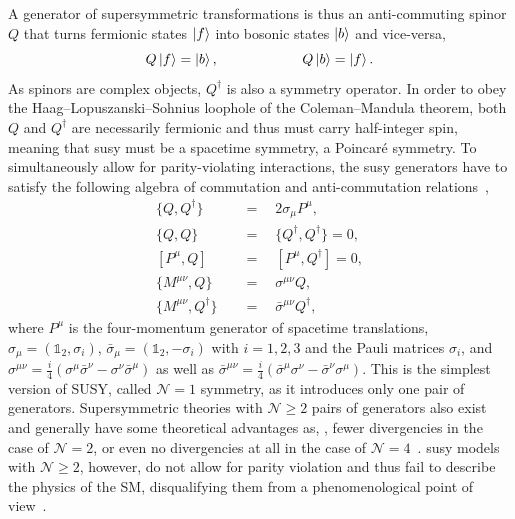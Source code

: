A generator of supersymmetric transformations is thus an anti-commuting spinor $Q$ that turns fermionic states $\ket{f}$ into bosonic states $\ket{b}$ and vice-versa,
\begin{equation}
	Q\ket{f} = \ket{b}, \qquad \qquad \qquad Q\ket{b}=\ket{f}.
\end{equation}
As spinors are complex objects, $Q^\dagger$ is also a symmetry operator. In order to obey the Haag--Lopuszanski--Sohnius loophole of the Coleman--Mandula theorem, both $Q$ and $Q^\dagger$ are necessarily fermionic and thus must carry half-integer spin, meaning that \gls{susy} must be a spacetime symmetry, \ie a Poincaré symmetry. To simultaneously allow for parity-violating interactions, the \gls{susy} generators have to satisfy the following algebra of commutation and anti-commutation relations~\cite{Bustamante:2009us},
\begin{equation}
\begin{split}
	\{ Q,Q^\dagger \} & \quad = \quad  2\sigma_\mu P^\mu,\\
	\{ Q,Q \} &  \quad = \quad \{ Q^\dagger,Q^\dagger \} = 0, \\
	\left[P^\mu,Q \right] &  \quad = \quad \left[ P^\mu,Q^\dagger \right] = 0, \\
	\{ M^{\mu\nu}, Q \} & \quad = \quad \sigma^{\mu\nu} Q,\\
	\{ M^{\mu\nu},Q^\dagger \} & \quad = \quad \bar{\sigma}^{\mu\nu} Q^\dagger,
  \label{eq:commute}
\end{split}
\end{equation}
where $P^\mu$ is the four-momentum generator of spacetime translations, $\sigma_\mu = (\mathbb{1}_2,\sigma_i)$, $\bar{\sigma}_\mu = (\mathbb{1}_2,-\sigma_i)$ with $i=1,2,3$ and the Pauli matrices $\sigma_i$, and $\sigma^{\mu\nu} = \frac{i}{4}(\sigma^\mu\bar{\sigma}^\nu - \sigma^\nu\bar{\sigma}^\mu)$ as well as $\bar{\sigma}^{\mu\nu} = \frac{i}{4}(\bar{\sigma}^\mu\sigma^\nu - \bar{\sigma}^\nu\sigma^\mu)$. This is the simplest version of SUSY, called $\mathcal{N}=1$ symmetry, as it introduces only one pair of generators. Supersymmetric theories with $\mathcal{N}\geq 2$ pairs of generators also exist and generally have some theoretical advantages as, \eg, fewer divergencies in the case of $\mathcal{N}=2$, or even no divergencies at all in the case of $\mathcal{N}=4$~\cite{Bustamante:2009us}. \gls{susy} models with $\mathcal{N}\geq 2$, however, do not allow for parity violation and thus fail to describe the physics of the SM, disqualifying them from a phenomenological point of view~\cite{Bustamante:2009us}.

